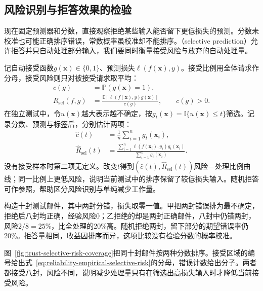 \subsection{风险识别与拒答效果的检验}
\label{sec:reliability-selection-evaluation}

现在固定预测器和分数，直接观察拒绝某些输入能否留下更低损失的预测。分数未校准也可能正确排序错误，常数概率虽校准却不能排序。（selective prediction）允许拒答并只自动处理部分输入，我们要同时衡量接受风险与放弃的自动处理量。

记自动接受函数$g(\bm{x})\in\{0,1\}$、预测损失$\ell(f(\bm{x}),y)$。接受比例用全体请求作分母，接受风险则只对被接受请求取平均：
\begin{equation}
 \begin{aligned}
 c(g)&=\mathbb P(g(\bm{x})=1),\\
 R_{\mathrm{sel}}(f,g)
 &=\frac{\mathbb E[\ell(f(\bm{x}),y)g(\bm{x})]}
         {c(g)},\qquad c(g)>0.
 \end{aligned}
 \label{eq:reliability-selective-risk}
\end{equation}
在独立测试中，令$u(\bm{x})$越大表示越不确定，按$g_t(\bm{x})=\mathbb I\{u(\bm{x})\leq t\}$筛选。记录分数、预测与标签后，分别估计两项：
\begin{equation}
 \begin{aligned}
 \hat c(t)&=\frac1n\sum_{i=1}^{n}g_t(\bm{x}_i),\\
 \hat R_{\mathrm{sel}}(t)
 &=\frac{\sum_{i=1}^{n}\ell(f(\bm{x}_i),y_i)g_t(\bm{x}_i)}
          {\sum_{i=1}^{n}g_t(\bm{x}_i)}.
 \end{aligned}
 \label{eq:reliability-empirical-selective-risk}
\end{equation}
没有接受样本时第二项无定义。改变$t$得到$(\hat c(t),\hat R_{\mathrm{sel}}(t))$风险—处理比例曲线；同一比例上更低风险，说明当前测试中的排序保留了较低损失输入。随机拒答可作参照，帮助区分风险识别与单纯减少工作量。

\begin{example}[相同拒答比例下的不同效果]
\label{ex:reliability-risk-ranking}
构造十封测试邮件，其中两封分错，损失取零一值。甲把两封错误排为最不确定，拒绝后八封均正确，经验风险0；乙拒绝的却是两封正确邮件，八封中仍错两封，风险$2/8=25\%$，比全处理的20\%高。随机拒绝两封，留下部分的期望错误率仍20\%。拒答量相同，收益因排序而异，这项比较没有检验分数的概率校准。
\end{example}

图~\ref{fig:trust-selective-risk-coverage}把同十封邮件按两种分数排序。接受区域的编号给出式~\eqref{eq:reliability-empirical-selective-risk}的分母，错误计数给出分子。两者都接受八封，风险不同，说明减少处理量只有在筛选出高损失输入时才降低当前接受风险。

